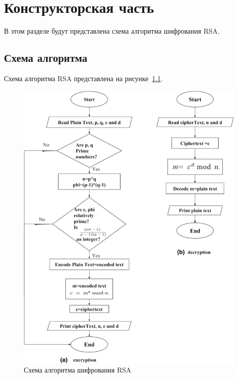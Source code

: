 \chapter{Конструкторская часть}

В этом разделе будут представлена схема алгоритма шифрования RSA.

\section{Схема алгоритма}

Схема алгоритма RSA представлена на рисунке~\ref{img:rsa_work}.

\begin{figure}[ht!]
	\centering
	\includegraphics[width=0.8\linewidth]{images/rsa_work.png}
	\caption{Схема алгоритма шифрования RSA}
	\label{img:rsa_work}
\end{figure}